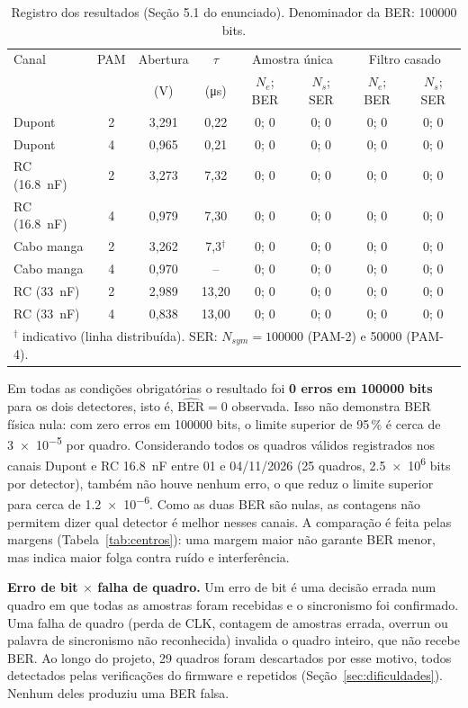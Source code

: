 \documentclass[12pt,a4paper]{article}
\begin{document}
\begin{table}[H]
\centering
\caption{Registro dos resultados (Seção 5.1 do enunciado). Denominador da BER: \num{100000} bits.}
\label{tab:ber}
\small
\begin{tabular}{l c c c c c c c}
\toprule
Canal & PAM & Abertura & $\tau$ & \multicolumn{2}{c}{Amostra única} & \multicolumn{2}{c}{Filtro casado} \\
 & & (V) & (\si{\micro\second}) & $N_e$; BER & $N_s$; SER & $N_e$; BER & $N_s$; SER \\
\midrule
Dupont & 2 & 3,291 & 0,22 & 0; 0 & 0; 0 & 0; 0 & 0; 0 \\
Dupont & 4 & 0,965 & 0,21 & 0; 0 & 0; 0 & 0; 0 & 0; 0 \\
RC (\SI{16,8}{nF}) & 2 & 3,273 & 7,32 & 0; 0 & 0; 0 & 0; 0 & 0; 0 \\
RC (\SI{16,8}{nF}) & 4 & 0,979 & 7,30 & 0; 0 & 0; 0 & 0; 0 & 0; 0 \\
Cabo manga & 2 & 3,262 & 7,3$^\dagger$ & 0; 0 & 0; 0 & 0; 0 & 0; 0 \\
Cabo manga & 4 & 0,970 & -- & 0; 0 & 0; 0 & 0; 0 & 0; 0 \\
\midrule
RC (\SI{33}{nF}) & 2 & 2,989 & 13,20 & 0; 0 & 0; 0 & 0; 0 & 0; 0 \\
RC (\SI{33}{nF}) & 4 & 0,838 & 13,00 & 0; 0 & 0; 0 & 0; 0 & 0; 0 \\
\bottomrule
\multicolumn{8}{l}{\footnotesize $^\dagger$ indicativo (linha distribuída). SER: $N_{sym}=\num{100000}$ (PAM-2) e \num{50000} (PAM-4).}
\end{tabular}
\end{table}

Em todas as condições obrigatórias o resultado foi \textbf{0 erros em \num{100000} bits} para os dois
detectores, isto é, $\widehat{\text{BER}} = 0$ observada. Isso não demonstra BER física nula: com
zero erros em \num{100000} bits, o limite superior de 95\,\% é cerca de \num{3e-5} por quadro.
Considerando todos os quadros válidos registrados nos canais Dupont e RC \SI{16,8}{nF} entre 01 e
04/11/2026 (25 quadros, \num{2.5e6} bits por detector), também não houve nenhum erro, o que reduz
o limite superior para cerca de \num{1.2e-6}. Como as duas BER são nulas, as contagens não permitem
dizer qual detector é melhor nesses canais. A comparação é feita pelas margens (Tabela~\ref{tab:centros}):
uma margem maior não garante BER menor, mas indica maior folga contra ruído e interferência.

\textbf{Erro de bit $\times$ falha de quadro.} Um erro de bit é uma decisão errada num quadro em que
todas as amostras foram recebidas e o sincronismo foi confirmado. Uma falha de quadro (perda de CLK,
contagem de amostras errada, overrun ou palavra de sincronismo não reconhecida) invalida o quadro
inteiro, que não recebe BER. Ao longo do projeto, 29 quadros foram descartados por esse motivo,
todos detectados pelas verificações do firmware e repetidos (Seção~\ref{sec:dificuldades}). Nenhum
deles produziu uma BER falsa.
\end{document}
